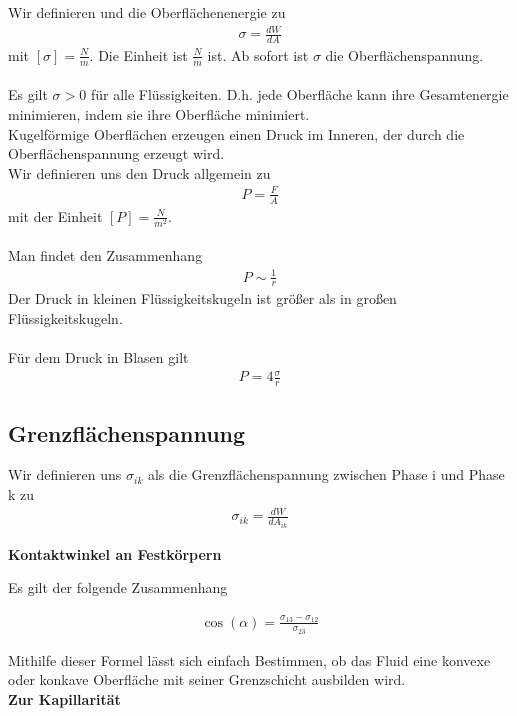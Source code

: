 \documentclass[a4paper,12pt]{report}
\begin{document}
Wir definieren und die Oberflächenenergie zu 
\begin{align}
\sigma = \frac{dW}{dA}
\end{align}
mit $[\sigma] = \frac{N}{m} $. Die Einheit ist $\frac{N}{m} $ ist. Ab sofort ist $\sigma$ die Oberflächenspannung. \\
\\
Es gilt $\sigma > 0$ für alle Flüssigkeiten. D.h. jede Oberfläche kann ihre Gesamtenergie minimieren, indem sie ihre Oberfläche minimiert. 
\\
Kugelförmige Oberflächen erzeugen einen Druck im Inneren, der durch die Oberflächenspannung erzeugt wird.\\
Wir definieren uns den Druck allgemein zu 
\begin{align}
P = \frac{F}{A} 
\end{align}
mit der Einheit $[P] = \frac{N}{m^2}$.\\
\\
Man findet den Zusammenhang 
\begin{align}
P \sim \frac{1}{r}
\end{align}
Der Druck in kleinen Flüssigkeitskugeln ist größer als in großen Flüssigkeitskugeln.\\
\\
Für dem Druck in Blasen gilt
\begin{align}
P = 4\frac{\sigma}{r}
\end{align}

\subsection{Grenzflächenspannung}
Wir definieren uns $\sigma_{ik}$ als die Grenzflächenspannung zwischen Phase i und Phase k zu 
\begin{align}
\sigma_{ik} = \frac{dW}{dA_{ik}}
\end{align}


\textbf{Kontaktwinkel an Festkörpern}

Es gilt der folgende Zusammenhang 

\begin{align}
\cos(\alpha) = \frac{\sigma_{13}-\sigma_{12}}{\sigma_{23}}
\end{align}

Mithilfe dieser Formel lässt sich einfach Bestimmen, ob das Fluid eine konvexe oder konkave Oberfläche mit seiner Grenzschicht ausbilden wird. \\

\textbf{Zur Kapillarität}
\end{document}
